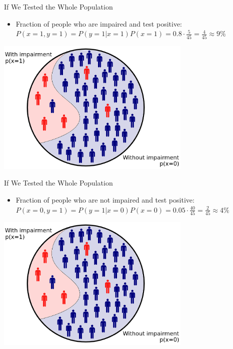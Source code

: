 \documentclass{beamer}
\begin{document}
\begin{frame}{If We Tested the Whole Population}
  \begin{itemize}
    \item Fraction of people who are impaired and test positive:
      \(
        P(x=1, y=1) = P(y = 1|x = 1)P(x = 1) = 0.8 \cdot \frac{5}{45} = \frac{4}{45} \approx 9\%
      \)
  \end{itemize}
  \begin{center}
    \includegraphics[width=0.7\textwidth]{whole_population.png}
  \end{center}
\end{frame}

\begin{frame}{If We Tested the Whole Population}
  \begin{itemize}
    \item Fraction of people who are not impaired and test positive:
      \(
        P(x=0, y=1) = P(y = 1|x = 0)P(x = 0) = 0.05 \cdot \frac{40}{45} = \frac{2}{45} \approx 4\%
      \)
  \end{itemize}
  \begin{center}
    \includegraphics[width=0.7\textwidth]{whole_population.png}
  \end{center}
\end{frame}
\end{document}
